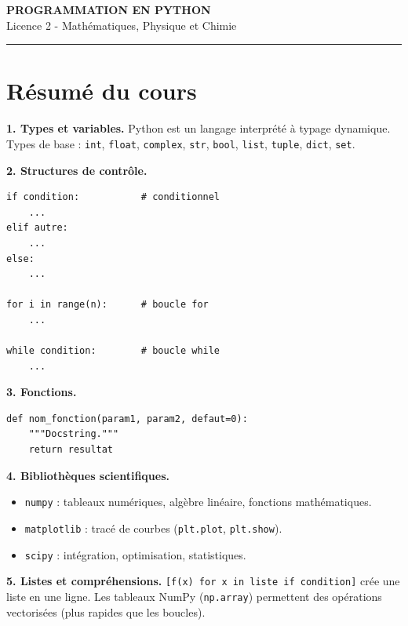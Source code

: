 \documentclass[12pt,a4paper]{article}
\begin{document}
\fi

\begin{center}
  {\LARGE\bfseries PROGRAMMATION EN PYTHON}\\[0.3cm]
  {\normalsize Licence 2 - Mathématiques, Physique et Chimie}\\[0.1cm]
  \rule{0.7\textwidth}{0.8pt}
\end{center}

\section*{Résumé du cours}

\begin{boiteresume}

\textbf{1. Types et variables.} Python est un langage interprété à typage dynamique. Types de base : \texttt{int}, \texttt{float}, \texttt{complex}, \texttt{str}, \texttt{bool}, \texttt{list}, \texttt{tuple}, \texttt{dict}, \texttt{set}.

\textbf{2. Structures de contrôle.}
\begin{lstlisting}
if condition:           # conditionnel
    ...
elif autre:
    ...
else:
    ...

for i in range(n):      # boucle for
    ...

while condition:        # boucle while
    ...
\end{lstlisting}

\textbf{3. Fonctions.}
\begin{lstlisting}
def nom_fonction(param1, param2, defaut=0):
    """Docstring."""
    return resultat
\end{lstlisting}

\textbf{4. Bibliothèques scientifiques.}
\begin{itemize}[nosep]
  \item \texttt{numpy} : tableaux numériques, algèbre linéaire, fonctions mathématiques.
  \item \texttt{matplotlib} : tracé de courbes (\texttt{plt.plot}, \texttt{plt.show}).
  \item \texttt{scipy} : intégration, optimisation, statistiques.
\end{itemize}

\textbf{5. Listes et compréhensions.} \texttt{[f(x) for x in liste if condition]} crée une liste en une ligne. Les tableaux NumPy (\texttt{np.array}) permettent des opérations vectorisées (plus rapides que les boucles).

\end{boiteresume}
\end{document}
